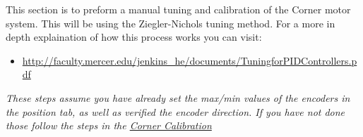 \documentclass[12pt]{article}
\begin{document}
This section is to preform a manual tuning and calibration of the  Corner motor system. This will be using the Ziegler-Nichols tuning method. For a more in depth explaination of how this process works you can visit:

\begin{itemize}
	\item  \href{http://faculty.mercer.edu/jenkins\_he/documents/TuningforPIDControllers.pdf}{http://faculty.mercer.edu/jenkins\_he/documents/TuningforPIDControllers.pdf}
\end{itemize}

\noindent \textit{These steps assume you have already set the max/min values of the encoders in the position tab, as well as verified the encoder direction. If you have not done those follow the steps in the \hyperref[corner_cal]{Corner Calibration}}
\end{document}
